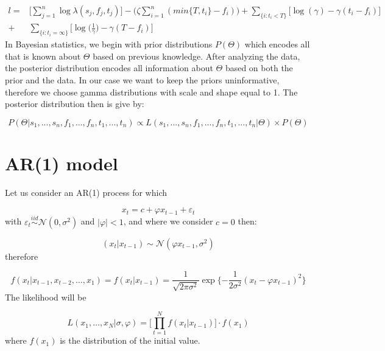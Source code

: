 \documentclass[11pt,a4paper]{article}
\newcommand{\eps}{\varepsilon}
\begin{document}
\[
\begin{aligned}
l = & \Bigg[ \sum_{j=1}^{n} \log \lambda(s_{j},f_{j}, t_{j}) \Bigg] - \bigg(\zeta \sum_{i=1}^{n} (min\{ T, t_i \} - f_i) \bigg)  + \sum_{\{ i : t_{i} < T \} }  \bigg[\log (\gamma) -\gamma(t_{i} - f_{i}) \bigg] \\
+ & \sum_{ \{ i : t_{i} = \infty \} } \bigg[\log \bigg(\frac{1}{\gamma}\bigg) -\gamma(T - f_{i}) \bigg]
\end{aligned}
\]
In Bayesian statistics, we begin with prior distributions $P(\Theta)$ which encodes all that is known about $\Theta$ based on previous knowledge. After analyzing the data, the posterior distribution encodes all information about $\Theta$ based on both the prior and the data. In our case we want to keep the priors uninformative, therefore we choose gamma distributions with scale and shape equal to 1. The posterior distribution then is give by:

\[
P(\Theta | s_{1}, ..., s_{n}, f_{1}, ... , f_{n}, t_{1}, ..., t_{n}) \propto L(s_{1}, ..., s_{n}, f_{1}, ... , f_{n}, t_{1}, ..., t_{n} | \Theta) \times P(\Theta)
\]




















\section{AR(1) model}


Let us consider an AR(1) process for which

\[
x_{t} = c +  \varphi x_{t-1} + \eps_{t}
\]
with $\eps_{t} \stackrel{iid}{\sim} \mathcal{N}(0, \sigma^{2})$ and $|\varphi| < 1$, and where we consider $c = 0$
then:

\[
(x_{t} | x_{t-1}) \sim \mathcal{N} (\varphi x_{t-1}, \sigma^{2})
\]
therefore

\[
f(x_{t} | x_{t-1} , x_{t-2}, \dots , x_{1}) = f(x_{t} | x_{t-1}) =  \frac{1}{\sqrt{2 \pi \sigma^{2}}} \exp \Bigg \{ { - \frac{1}{2 \sigma^{2}} }  (x_{t} - \varphi x_{t-1})^{2} \Bigg \}
\]
The likelihood will be

\[
L(x_{1}, \dots , x_{N} | \sigma, \varphi) = \Bigg [ \prod_{t=1}^{N} f(x_{t} | x_{t-1}) \Bigg] \cdot f(x_{1})
\]
where $f(x_{1})$ is the distribution of the initial value.
\end{document}
